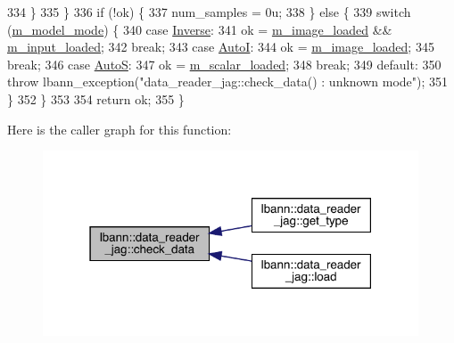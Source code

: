 \begin{DoxyCode}
334     \}
335   \}
336   \textcolor{keywordflow}{if} (!ok) \{
337     num\_samples = 0u;
338   \} \textcolor{keywordflow}{else} \{
339     \textcolor{keywordflow}{switch} (\hyperlink{classlbann_1_1data__reader__jag_a877eb1f0eb2afccd73cd7d69407ff6e2}{m\_model\_mode}) \{
340       \textcolor{keywordflow}{case} \hyperlink{classlbann_1_1data__reader__jag_a114c369c8604df385cf7a3ec20c9739ba2d3bba9f202270762169c1c01d2fb7a4}{Inverse}:
341         ok = \hyperlink{classlbann_1_1data__reader__jag_a3f1691818996f73dc918dfd0e8f98a70}{m\_image\_loaded} && \hyperlink{classlbann_1_1data__reader__jag_ae047bbae82c4a8eceedceeea2e1815ad}{m\_input\_loaded};
342         \textcolor{keywordflow}{break};
343       \textcolor{keywordflow}{case} \hyperlink{classlbann_1_1data__reader__jag_a114c369c8604df385cf7a3ec20c9739bae9c49fc4443020e18086fc83ce0b369b}{AutoI}:
344         ok = \hyperlink{classlbann_1_1data__reader__jag_a3f1691818996f73dc918dfd0e8f98a70}{m\_image\_loaded};
345         \textcolor{keywordflow}{break};
346       \textcolor{keywordflow}{case} \hyperlink{classlbann_1_1data__reader__jag_a114c369c8604df385cf7a3ec20c9739baab2b8e8bef02dfc8ffaae80bdd0a7fd4}{AutoS}:
347         ok = \hyperlink{classlbann_1_1data__reader__jag_add9f037609b73da931a4a8a460798db9}{m\_scalar\_loaded};
348         \textcolor{keywordflow}{break};
349       \textcolor{keywordflow}{default}:
350         \textcolor{keywordflow}{throw} lbann\_exception(\textcolor{stringliteral}{"data\_reader\_jag::check\_data() : unknown mode"});
351     \}
352   \}
353 
354   \textcolor{keywordflow}{return} ok;
355 \}
\end{DoxyCode}
Here is the caller graph for this function\+:\nopagebreak
\begin{figure}[H]
\begin{center}
\leavevmode
\includegraphics[width=316pt]{classlbann_1_1data__reader__jag_a2f6bcf33c1efdcef1c0cc0ac9756968b_icgraph}
\end{center}
\end{figure}
\mbox{\label{classlbann_1_1data__reader__jag_aa4c2d2536e32af08762cf159981631af}} 
